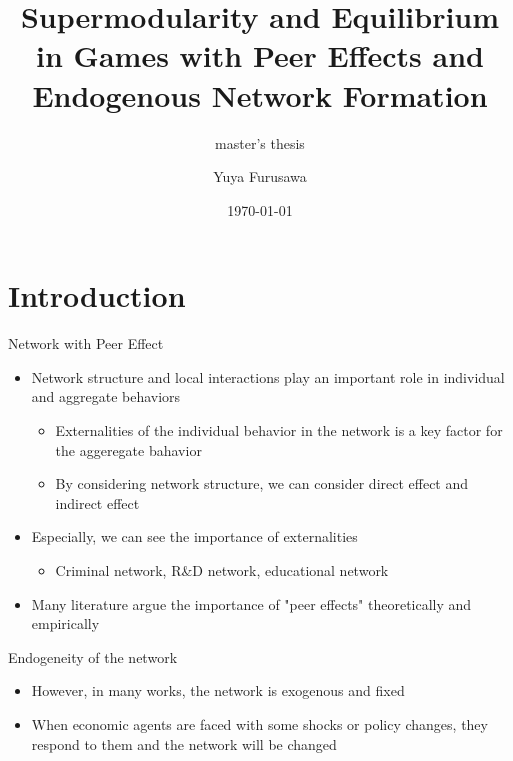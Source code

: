 \documentclass[10pt,dvipdfmx]{beamer}
\title{Supermodularity and Equilibrium in Games with Peer Effects and Endogenous Network Formation}
\subtitle{master's thesis}
\date{\today}
\author{Yuya Furusawa}
\institute{U-Tokyo, GSE}
\begin{document}
\maketitle


\section{Introduction}

\begin{frame}{Network with Peer Effect}
\begin{itemize}
    \item Network structure and local interactions play an important role in individual and aggregate behaviors
    \begin{itemize}
        \item Externalities of the individual behavior in the network is a key factor for the aggeregate bahavior
        \item By considering network structure, we can consider direct effect and indirect effect
    \end{itemize}
    \item Especially, we can see the importance of externalities
    \begin{itemize}
        \item Criminal network, R\&D network, educational network
    \end{itemize}
    \item Many literature argue the importance of "peer effects" theoretically and empirically
\end{itemize}
\end{frame}

\begin{frame}{Endogeneity of the network}
\begin{itemize}
    \item However, in many works, the network is exogenous and fixed
    \item When economic agents are faced with some shocks or policy changes, they respond to them and the network will be changed
\end{itemize}
\end{frame}
\end{document}
